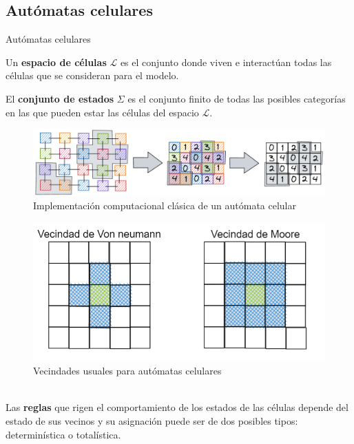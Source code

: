 \documentclass[9pt]{beamer}
\begin{document}
\subsection{Autómatas celulares}
\begin{frame}{Autómatas celulares}

Un \textbf{espacio de células} $\mathcal{L}$ es el conjunto donde viven e interactúan todas las células que se consideran para el modelo. %

El \textbf{conjunto de estados} $\Sigma$ es el conjunto finito de todas las posibles categorías en las que pueden estar las células del espacio $\mathcal{L}$. %

\begin{minipage}{0.6\textwidth}
\begin{figure}[h]
  \centering
    \includegraphics[width=1.1\textwidth]{Imagenes/ACaMatriz.PNG}
  \caption{Implementación computacional clásica de un autómata celular}
  \label{fig:AC a matriz}
\end{figure}
\end{minipage}
\hfill
\begin{minipage}{0.3\textwidth}
\begin{figure}[h]
  \centering
    \includegraphics[width=1\textwidth]{Imagenes/vecindades.PNG}
  \caption{Vecindades usuales para autómatas celulares}
  \label{fig:Moore - Von neumann}
\end{figure}
\end{minipage}\\
Las \textbf{reglas} que rigen el comportamiento de los estados de las células depende del estado de sus vecinos y su asignación puede ser de dos posibles tipos: determinística o totalística.
\end{frame}
\end{document}
